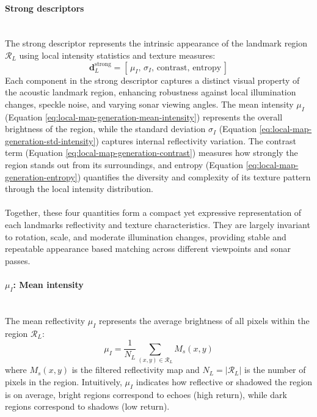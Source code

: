 \paragraph{Strong descriptors} \mbox{}\\[0.5em] \noindent
The strong descriptor represents the intrinsic appearance of the landmark region $\mathcal{R}_L$ using local intensity statistics and texture measures:  
\begin{equation}
    \mathbf{d}_L^{\text{strong}} = [\, \mu_I,\, \sigma_I,\, \text{contrast},\, \text{entropy} \,]
    \label{eq:local-map-generation-descriptors-strong}
\end{equation}
Each component in the strong descriptor captures a distinct visual property of the acoustic landmark region, enhancing robustness against local illumination changes, speckle noise, and varying sonar viewing angles. The mean intensity $\mu_I$ (Equation \ref{eq:local-map-generation-mean-intensity}) represents the overall brightness of the region, while the standard deviation $\sigma_I$ (Equation \ref{eq:local-map-generation-std-intensity}) captures internal reflectivity variation. The contrast term (Equation \ref{eq:local-map-generation-contrast}) measures how strongly the region stands out from its surroundings, and entropy (Equation \ref{eq:local-map-generation-entropy}) quantifies the diversity and complexity of its texture pattern through the local intensity distribution.  
\\ \\
Together, these four quantities form a compact yet expressive representation of each landmarks reflectivity and texture characteristics. They are largely invariant to rotation, scale, and moderate illumination changes, providing stable and repeatable appearance based matching across different viewpoints and sonar passes.

\paragraph{$\mu_I$: Mean intensity} \mbox{}\\[0.5em] \noindent
The mean reflectivity $\mu_I$ represents the average brightness of all pixels within the region $\mathcal{R}_L$:
\begin{equation}
    \mu_I = \frac{1}{N_L} \sum_{(x,y) \in \mathcal{R}_L} M_s(x,y)
    \label{eq:local-map-generation-mean-intensity}
\end{equation}
where $M_s(x,y)$ is the filtered reflectivity map and $N_L = |\mathcal{R}_L|$ is the number of pixels in the region.  
Intuitively, $\mu_I$ indicates how reflective or shadowed the region is on average, bright regions correspond to echoes (high return), while dark regions correspond to shadows (low return).

